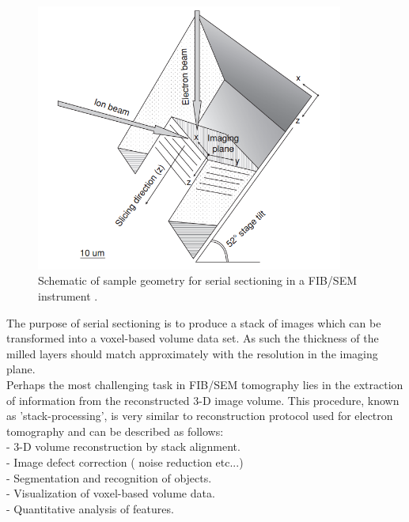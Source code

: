 \begin{figure}[!ht]
	\centering
	\includegraphics[width=0.9\textwidth]{Figs/Ch2/SnV.png}
	\caption[h] {Schematic of sample geometry for serial sectioning in a FIB/SEM instrument \cite{Holzer2004}.}
	\label{2.10}
\end{figure}
\FloatBarrier

The purpose of serial sectioning is to produce a stack of images which can be transformed into a voxel-based volume data set. As such the thickness of the milled layers should match approximately with the resolution in the imaging plane.\\
Perhaps the most challenging task in FIB/SEM tomography lies in the extraction of information from the reconstructed 3-D image volume. This procedure, known as 'stack-processing', is very similar to reconstruction protocol used for electron tomography and can be described as follows:\\
\indent - 3-D volume reconstruction by stack alignment.\\
\indent - Image defect correction ( noise reduction etc...)\\
\indent - Segmentation and recognition of objects.\\
\indent - Visualization of voxel-based volume data.\\
\indent - Quantitative analysis of features.





